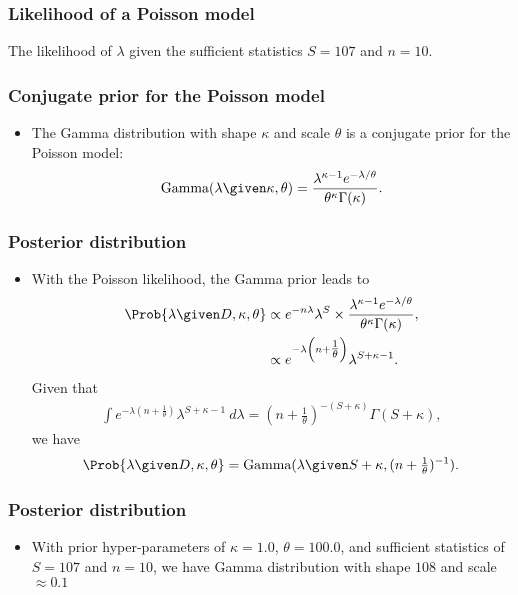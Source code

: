 \documentclass{slides}
\begin{document}
	\begin{frame}
		\frametitle{Likelihood of a Poisson model}
		

		The likelihood of $\lambda$ given the sufficient statistics $S=107$ and $n=10$.
	\end{frame}

	\begin{frame}
		\frametitle{Conjugate prior for the Poisson model}
		\begin{itemize}
			\item The Gamma distribution with shape $\kappa$ and scale $\theta$ is a conjugate prior for the Poisson model:
				\[
					\textrm{Gamma}(\lambda \given \kappa, \theta) = \frac{\lambda^{\kappa-1} e^{-\lambda/\theta}}{\theta^\kappa \Gamma(\kappa)}.
				\]
		\end{itemize}

		\hspace*{-5mm}
		

	\end{frame}

	\begin{frame}
		\frametitle{Posterior distribution}
		\begin{itemize}
	
			\item With the Poisson likelihood, the Gamma prior leads to 
				\begin{align*}
					\Prob{\lambda\given D, \kappa,\theta} &\propto  e^{-n\lambda} \lambda^{S} \times \frac{\lambda^{\kappa-1} e^{-\lambda/\theta}}{\theta^\kappa \Gamma(\kappa)},\\
					&\propto e^{-\lambda\left(n+\tfrac{1}{\theta}\right)} \lambda^{S + \kappa - 1}.
				\end{align*}
				Given that 
				\begin{align*}
					\int e^{-\lambda\left(n+\tfrac{1}{\theta}\right)} \lambda^{S + \kappa - 1}\ d\lambda = \left(n + \tfrac{1}{\theta}\right)^{-(S+\kappa)}\Gamma(S+\kappa),
				\end{align*}
				we have
				\[
					\Prob{\lambda\given D, \kappa,\theta} = \textrm{Gamma}(\lambda \given S+\kappa, (n + \tfrac{1}{\theta})^{-1}).
				\]
		\end{itemize}
	\end{frame}

	\begin{frame}
		\frametitle{Posterior distribution}
		\begin{itemize}
	
			\item With prior hyper-parameters of $\kappa=1.0$, $\theta=100.0$, and sufficient statistics of $S=107$ and $n=10$, we have Gamma distribution with shape $108$ and scale $\approx 0.1$
		\end{itemize}

		\hspace*{-5mm}
		
	\end{frame}
\end{document}

